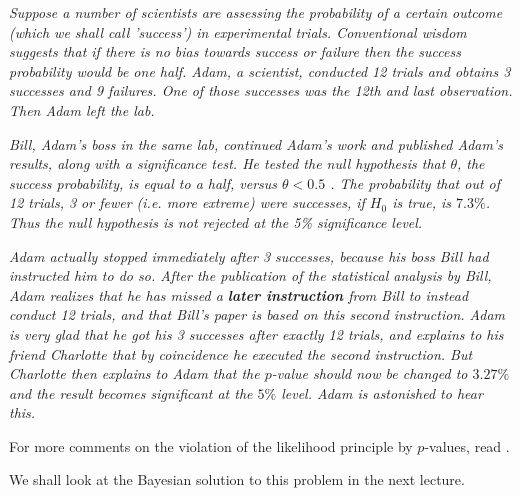 \documentclass{scrartcl}
\begin{document}
\textit{Suppose a number of scientists are assessing the probability
of a certain outcome (which we shall call 'success') in experimental
trials. Conventional wisdom suggests that if there is no bias towards
success or failure then the success probability would be one
half. Adam, a scientist, conducted 12 trials and obtains 3 successes
and 9 failures. One of those successes was the 12th and last
observation. Then Adam left the lab.}
 
\textit{Bill, Adam's boss in the same lab, continued Adam's work and published
Adam's results, along with a significance test. He tested the null
hypothesis that $\theta$, the success probability, is equal to a half, versus
$\theta < 0.5$ . The probability that out of 12 trials, 3 or fewer
(i.e. more extreme) were successes, if $H_0$ is true, is $7.3\%$. Thus
the null hypothesis is not rejected at the 5\% significance level.}

\textit{Adam actually stopped immediately after 3 successes, because his boss Bill had
instructed him to do so. After the publication of the statistical
analysis by Bill, Adam realizes that he has missed a \textbf{later instruction}
from Bill to instead conduct 12 trials, and that Bill's paper is based
on this second instruction. Adam is very glad that he got his 3
successes after exactly 12 trials, and explains to his friend
Charlotte that by coincidence he executed the second
instruction. But Charlotte then explains to Adam that the $p$-value
should now be changed to $3.27\%$ and the result becomes significant
at the $5\%$ level. Adam is astonished to hear this.}

For more comments on the violation of the likelihood principle by
$p$-values, read \citet[Section 37.2]{MacKay}.

We shall look at the Bayesian solution to this problem in the next
lecture. 



\end{document}
